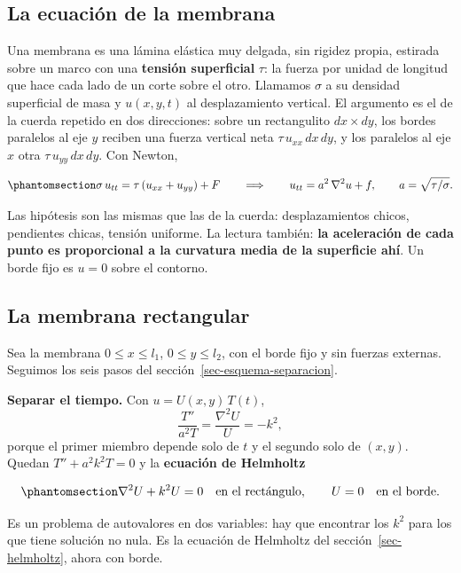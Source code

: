 \documentclass[
  spanish,
  a4paper,
]{scrbook}
\theoremstyle{definition}
\theoremstyle{plain}
\theoremstyle{definition}
\theoremstyle{plain}
\theoremstyle{definition}
\theoremstyle{remark}
\begin{document}
\subsection{La ecuación de la membrana}\label{sec-hip-membrana-ec}

Una membrana es una lámina elástica muy delgada, sin rigidez propia,
estirada sobre un marco con una \textbf{tensión superficial} \(\tau\):
la fuerza por unidad de longitud que hace cada lado de un corte sobre el
otro. Llamamos \(\sigma\) a su densidad superficial de masa y
\(u(x,y,t)\) al desplazamiento vertical. El argumento es el de la cuerda
repetido en dos direcciones: sobre un rectangulito \(dx\times dy\), los
bordes paralelos al eje \(y\) reciben una fuerza vertical neta
\(\tau\,u_{xx}\,dx\,dy\), y los paralelos al eje \(x\) otra
\(\tau\,u_{yy}\,dx\,dy\). Con Newton,

\begin{equation}\protect\phantomsection\label{eq-hip-membrana}{
\sigma\,u_{tt} = \tau\,(u_{xx}+u_{yy}) + F
\qquad\Longrightarrow\qquad
u_{tt} = a^2\,\nabla^2u + f, \qquad a = \sqrt{\tau/\sigma}.
}\end{equation}

Las hipótesis son las mismas que las de la cuerda: desplazamientos
chicos, pendientes chicas, tensión uniforme. La lectura también:
\textbf{la aceleración de cada punto es proporcional a la curvatura
media de la superficie ahí}. Un borde fijo es \(u=0\) sobre el contorno.

\subsection{La membrana rectangular}\label{sec-hip-rectangular}

Sea la membrana \(0\le x\le l_1\), \(0\le y\le l_2\), con el borde fijo
y sin fuerzas externas. Seguimos los seis pasos del
sección~\ref{sec-esquema-separacion}.

\textbf{Separar el tiempo.} Con \(u = U(x,y)\,T(t)\), \[
\frac{T''}{a^2T} = \frac{\nabla^2U}{U} = -k^2 ,
\] porque el primer miembro depende solo de \(t\) y el segundo solo de
\((x,y)\). Quedan \(T'' + a^2k^2T = 0\) y la \textbf{ecuación de
Helmholtz}

\begin{equation}\protect\phantomsection\label{eq-hip-helmholtz-rect}{
\nabla^2U + k^2U = 0 \quad\text{en el rectángulo}, \qquad U = 0 \quad\text{en el borde}.
}\end{equation}

Es un problema de autovalores en dos variables: hay que encontrar los
\(k^2\) para los que tiene solución no nula. Es la ecuación de Helmholtz
del sección~\ref{sec-helmholtz}, ahora con borde.
\end{document}
